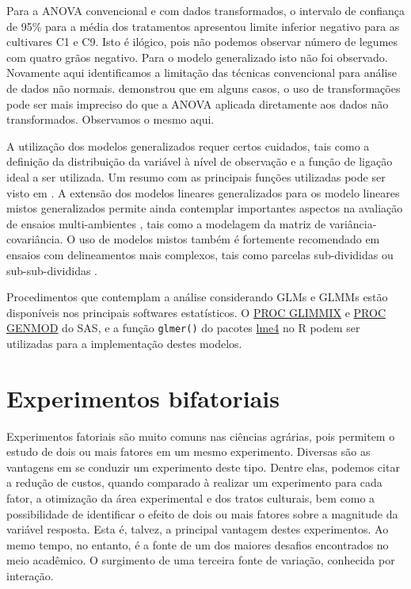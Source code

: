\documentclass[
]{book}
\begin{document}
Para a ANOVA convencional e com dados transformados, o intervalo de confiança de 95\% para a média dos tratamentos apresentou limite inferior negativo para as cultivares C1 e C9. Isto é ilógico, pois não podemos observar número de legumes com quatro grãos negativo. Para o modelo generalizado isto não foi observado. Novamente aqui identificamos a limitação das técnicas convencional para análise de dados não normais. \citet{Stroup2013} demonstrou que em alguns casos, o uso de transformações pode ser mais impreciso do que a ANOVA aplicada diretamente aos dados não transformados. Observamos o mesmo aqui.

A utilização dos modelos generalizados requer certos cuidados, tais como a definição da distribuição da variável à nível de observação e a função de ligação ideal a ser utilizada. Um resumo com as principais funções utilizadas pode ser visto em \citet{Stroup2015}. A extensão dos modelos lineares generalizados para os modelo lineares mistos generalizados permite ainda contemplar importantes aspectos na avaliação de ensaios multi-ambientes , tais como a modelagem da matriz de variância-covariância. O uso de modelos mistos também é fortemente recomendado em ensaios com delineamentos mais complexos, tais como parcelas sub-divididas ou sub-sub-divididas \citep{Piepho2018}.

Procedimentos que contemplam a análise considerando GLMs e GLMMs estão disponíveis nos principais softwares estatísticos. O \href{https://support.sas.com/documentation/cdl/en/statug/63033/HTML/default/viewer.htm\#statug_glimmix_a0000001394.htm}{PROC GLIMMIX} e \href{https://support.sas.com/documentation/cdl/en/statug/63033/HTML/default/viewer.htm\#statug_genmod_sect001.htm}{PROC GENMOD} do SAS, e a função \texttt{glmer()} do pacotes \href{https://cran.r-project.org/web/packages/lme4/index.html}{lme4} no R podem ser utilizadas para a implementação destes modelos.

\hypertarget{efat}{%
\section{Experimentos bifatoriais}\label{efat}}

Experimentos fatoriais são muito comuns nas ciências agrárias, pois permitem o estudo de dois ou mais fatores em um mesmo experimento. Diversas são as vantagens em se conduzir um experimento deste tipo. Dentre elas, podemos citar a redução de custos, quando comparado à realizar um experimento para cada fator, a otimização da área experimental e dos tratos culturais, bem como a possibilidade de identificar o efeito de dois ou mais fatores sobre a magnitude da variável resposta. Esta é, talvez, a principal vantagem destes experimentos. Ao memo tempo, no entanto, é a fonte de um dos maiores desafios encontrados no meio acadêmico. O surgimento de uma terceira fonte de variação, conhecida por interação. 
\end{document}
